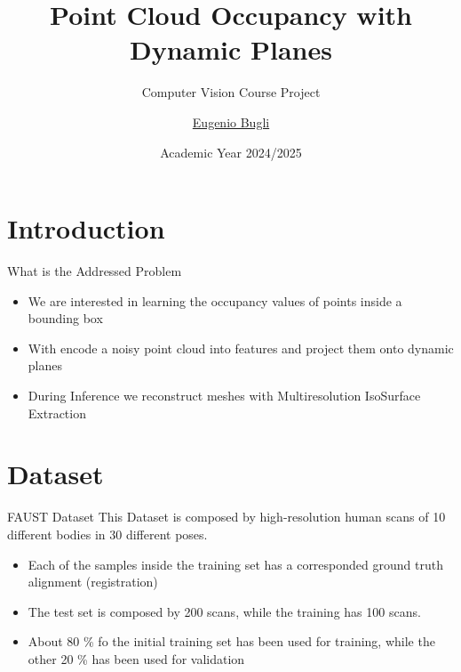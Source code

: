 \documentclass{beamer}
\title{Point Cloud Occupancy with Dynamic Planes}
\subtitle{Computer Vision Course Project}
\author{\href{mailto:bugli.1934824@studenti.uniroma1.it}{Eugenio Bugli}}
\date{Academic Year 2024/2025}
\begin{document}
\maketitle

\section{Introduction}

\begin{frame}{What is the Addressed Problem}
\begin{itemize}
	\item We are interested in learning the occupancy values of points inside a bounding box
	\item With encode a noisy point cloud into features and project them onto dynamic planes 
	\item During Inference we reconstruct meshes with Multiresolution IsoSurface Extraction
\end{itemize}
\end{frame} 

\section{Dataset}

\begin{frame}{FAUST Dataset}
    This Dataset is composed by high-resolution human scans of 10 different bodies in 30 different poses. 
    \begin{itemize}
    \item Each of the samples inside the training set has a corresponded ground truth alignment (registration)
    \item The test set is composed by 200 scans, while the training has 100 scans.
    \item About 80 \% fo the initial training set has been used for training, while the other 20 \% has been used for validation 
    \end{itemize}
\end{frame}


\end{document}
